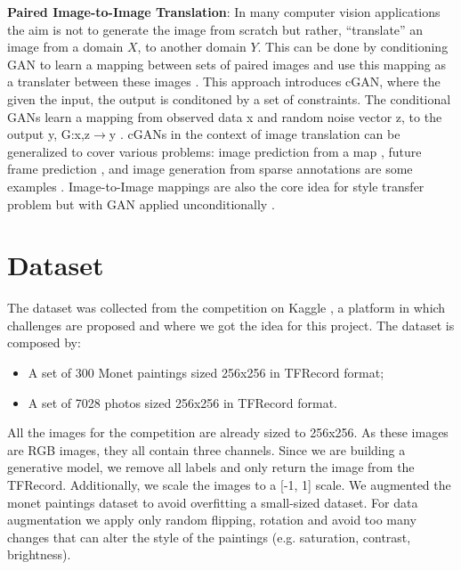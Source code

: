 \documentclass[10pt,twocolumn,letterpaper]{article}
\begin{document}
\textbf{Paired Image-to-Image Translation}: In many computer vision applications the aim is not to generate the image from scratch but rather, “translate” an image from a domain $X$, to another domain $Y$. This can be done by conditioning GAN to learn a mapping between sets of paired images and use this mapping as a translater between these images \cite{imgtoimg}. This approach introduces cGAN, where the given the input, the output is conditoned by a set of constraints. The conditional GANs learn a mapping from observed data x and random noise vector z, to the output y, G:{x,z}$\rightarrow$y \cite{imgtoimg}. cGANs in the context of image translation can be generalized to cover various problems: image prediction from a map \cite{example1}, future frame prediction \cite{example2}, and image generation from sparse annotations are some examples \cite{example3}. Image-to-Image mappings are also the core idea for style transfer problem but with GAN applied unconditionally \cite{example4}.

\section{Dataset}

The dataset was collected from the competition on Kaggle \cite{kaggle}, a platform in which challenges are proposed and where we got the idea for this project. The dataset is composed by:
\begin{itemize}
\item A set of 300 Monet paintings sized 256x256 in TFRecord format;
\item A set of 7028 photos sized 256x256 in TFRecord format.
\end{itemize}
All the images for the competition are already sized to 256x256. As these images are RGB images, they all contain three channels. Since we are building a generative model, we remove all labels and only return the image from the TFRecord. Additionally, we scale the images to a [-1, 1] scale. We augmented the monet paintings dataset to avoid overfitting a small-sized dataset. For data augmentation we apply only random flipping, rotation and avoid too many changes that can alter the style of the paintings (e.g. saturation, contrast, brightness).
\end{document}
